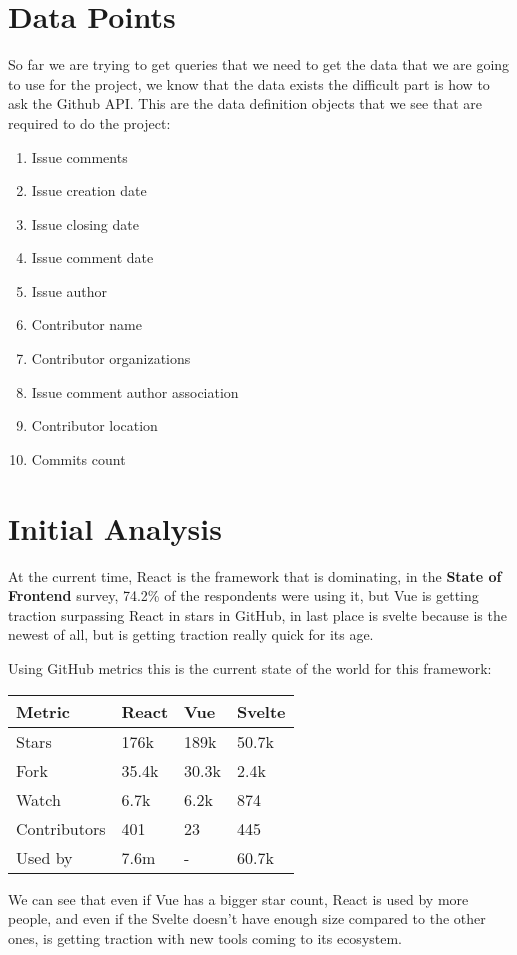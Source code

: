 \section{Data Points}
So far we are trying to get queries that we need to get the data that we are going to use for the project, we know that the data exists the difficult part is how to ask the Github API.\newline\newline
\noindent
This are the data definition objects that we see that are required to do the project:
\begin{enumerate}
    \item Issue comments 
    \item Issue creation date
    \item Issue closing date 
    \item Issue comment date 
    \item Issue author 
    \item Contributor name 
    \item Contributor organizations
    \item Issue comment author association 
    \item Contributor location 
    \item Commits count 
\end{enumerate}

\pagebreak

\section{Initial Analysis}
At the current time, React is the framework that is dominating, in the \textbf{State of Frontend} survey, 74.2\% of the respondents were using it, but Vue is getting traction surpassing React in stars in GitHub, in last place is svelte because is the newest of all, but is getting traction really quick for its age.\newline\newline

\noindent
Using GitHub metrics this is the current state of the world for this framework:
\begin{center}
    \begin{tabular}{|p{3cm} | p{2cm} | p{2cm}| p{2cm}|}
        \hline
        \textbf{Metric} & \textbf{React} & \textbf{Vue} & \textbf{Svelte}\\
        \hline
        Stars & 176k & 189k & 50.7k \\ 
        \hline
        Fork & 35.4k & 30.3k & 2.4k \\  
        \hline
        Watch & 6.7k & 6.2k & 874 \\
        \hline
        Contributors & 401 & 23 & 445  \\
        \hline
        Used by & 7.6m & - & 60.7k  \\
        \hline
    \end{tabular}
\end{center}
\noindent
We can see that even if Vue has a bigger star count, React is used by more people, and even if the Svelte doesn't have enough size compared to the other ones, is getting traction with new tools coming to its ecosystem.

